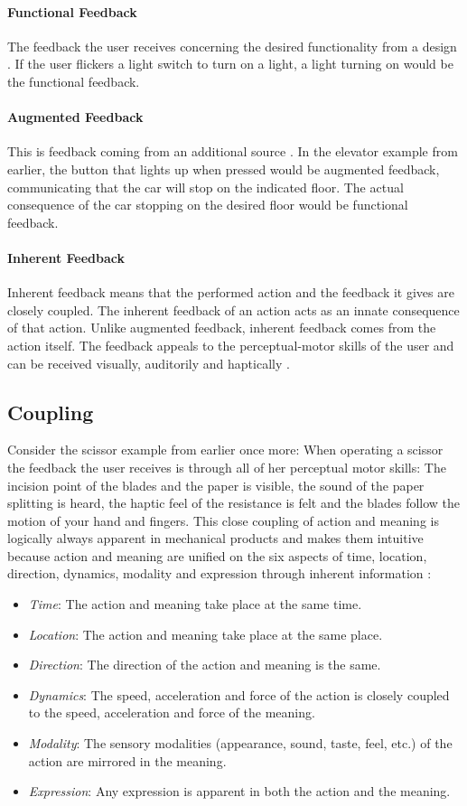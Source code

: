 \paragraph{Functional Feedback} The feedback the user receives concerning the desired functionality from a design \cite{frogger}. If the user flickers a light switch to turn on a light, a light turning on would be the functional feedback.
\paragraph{Augmented Feedback} This is feedback coming from an additional source \cite{frogger}. In the elevator example from earlier, the button that lights up when pressed would be augmented feedback, communicating that the car will stop on the indicated floor. The actual consequence of the car stopping on the desired floor would be functional feedback.
\paragraph{Inherent Feedback} Inherent feedback means that the performed action and the feedback it gives are closely coupled. The inherent feedback of an action acts as an innate consequence of that action. Unlike augmented feedback, inherent feedback comes from the action itself. The feedback appeals to the perceptual-motor skills of the user and can be received visually, auditorily and haptically \cite{frogger}.

\subsection{Coupling}
Consider the scissor example from earlier once more: When operating a scissor the feedback the user receives is through all of her perceptual motor skills: The incision point of the blades and the paper is visible, the sound of the paper splitting is heard, the haptic feel of the resistance is felt and the blades follow the motion of your hand and fingers. This close coupling of action and meaning is logically always apparent in mechanical products and makes them intuitive because action and meaning are unified on the six aspects of time, location, direction, dynamics, modality and expression through inherent information \cite{frogger} \cite{transbehav}:
\begin{itemize}
  \item \textit{Time}: The action and meaning take place at the same time.
  \item \textit{Location}: The action and meaning take place at the same place.
  \item \textit{Direction}: The direction of the action and meaning is the same.
  \item \textit{Dynamics}: The speed, acceleration and force of the action is closely coupled to the speed, acceleration and force of the meaning.
  \item \textit{Modality}: The sensory modalities (appearance, sound, taste, feel, etc.) of the action are mirrored in the meaning.
  \item \textit{Expression}: Any expression is apparent in both the action and the meaning.
\end{itemize}

